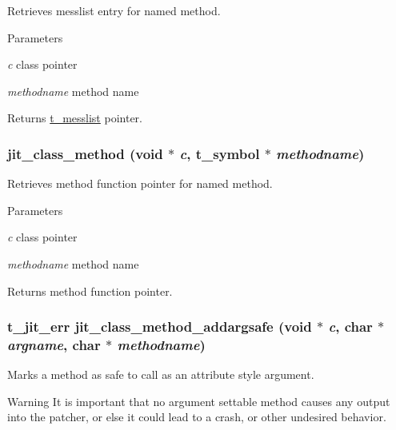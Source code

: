 Retrieves messlist entry for named method. 
\begin{DoxyParams}{Parameters}
\item[{\em c}]class pointer \item[{\em methodname}]method name\end{DoxyParams}
\begin{DoxyReturn}{Returns}
\hyperlink{structt__messlist}{t\_\-messlist} pointer. 
\end{DoxyReturn}
\hypertarget{group__classmod_ga61fe690506e449d09569e3e8592b274c}{
\subsubsection[{jit\_\-class\_\-method}]{ jit\_\-class\_\-method (void $\ast$ {\em c}, \/  {\bf t\_\-symbol} $\ast$ {\em methodname})}}
\label{group__classmod_ga61fe690506e449d09569e3e8592b274c}


Retrieves method function pointer for named method. 
\begin{DoxyParams}{Parameters}
\item[{\em c}]class pointer \item[{\em methodname}]method name\end{DoxyParams}
\begin{DoxyReturn}{Returns}
method function pointer. 
\end{DoxyReturn}
\hypertarget{group__classmod_gafcda1659cb3299a25f0f3f2a570a0d2f}{
\subsubsection[{jit\_\-class\_\-method\_\-addargsafe}]{\setlength{\rightskip}{0pt plus 5cm}t\_\-jit\_\-err jit\_\-class\_\-method\_\-addargsafe (void $\ast$ {\em c}, \/  char $\ast$ {\em argname}, \/  char $\ast$ {\em methodname})}}
\label{group__classmod_gafcda1659cb3299a25f0f3f2a570a0d2f}


Marks a method as safe to call as an attribute style argument. \begin{DoxyWarning}{Warning}
It is important that no argument settable method causes any output into the patcher, or else it could lead to a crash, or other undesired behavior.
\end{DoxyWarning}

